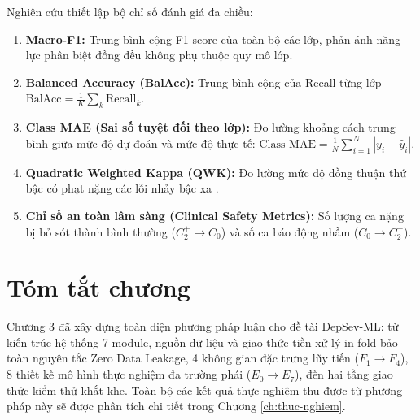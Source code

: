 Nghiên cứu thiết lập bộ chỉ số đánh giá đa chiều:
\begin{enumerate}
    \item \textbf{Macro-F1:} Trung bình cộng F1-score của toàn bộ các lớp, phản ánh năng lực phân biệt đồng đều không phụ thuộc quy mô lớp.
    \item \textbf{Balanced Accuracy (BalAcc):} Trung bình cộng của Recall từng lớp $\text{BalAcc} = \frac{1}{K}\sum_k \text{Recall}_k$.
    \item \textbf{Class MAE (Sai số tuyệt đối theo lớp):} Đo lường khoảng cách trung bình giữa mức độ dự đoán và mức độ thực tế: $\text{Class MAE} = \frac{1}{N} \sum_{i=1}^N |y_i - \hat{y}_i|$.
    \item \textbf{Quadratic Weighted Kappa (QWK):} Đo lường mức độ đồng thuận thứ bậc có phạt nặng các lỗi nhảy bậc xa \cite{cohen1968weighted}.
    \item \textbf{Chỉ số an toàn lâm sàng (Clinical Safety Metrics):} Số lượng ca nặng bị bỏ sót thành bình thường ($C_2^+ \to C_0$) và số ca báo động nhầm ($C_0 \to C_2^+$).
\end{enumerate}

\section{Tóm tắt chương}
\label{sec:tom-tat-chuong-3}

Chương 3 đã xây dựng toàn diện phương pháp luận cho đề tài DepSev-ML: từ kiến trúc hệ thống 7 module, nguồn dữ liệu và giao thức tiền xử lý in-fold bảo toàn nguyên tắc Zero Data Leakage, 4 không gian đặc trưng lũy tiến ($F_1 \to F_4$), 8 thiết kế mô hình thực nghiệm đa trường phái ($E_0 \to E_7$), đến hai tầng giao thức kiểm thử khắt khe. Toàn bộ các kết quả thực nghiệm thu được từ phương pháp này sẽ được phân tích chi tiết trong Chương \ref{ch:thuc-nghiem}.


